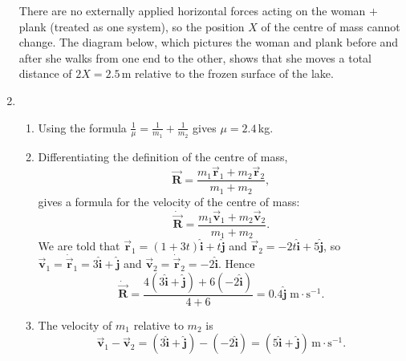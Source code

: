 \documentclass[12pt]{article}
\begin{document}
\begin{enumerate}
  There are no externally applied horizontal forces acting on the woman
  $+$ plank (treated as one system), so the position $X$ of the centre
  of mass cannot change. The diagram below, which pictures the woman and
  plank before and after she walks from one end to the other, shows that
  she moves a total distance of $2X = 2.5\,$m relative to the frozen
  surface of the lake.

\item
  \begin{enumerate}

  \item Using the formula
    $\displaystyle \frac{1}{\mu} = \frac{1}{m_1} + \frac{1}{m_2}$ gives
    $\mu = 2.4\,$kg.

  \item Differentiating the definition of the centre of mass,
    \begin{displaymath}
      \vec{\boldsymbol{R}} = \frac{m_1 \vec{\boldsymbol{r}}_1 + m_2 \vec{\boldsymbol{r}}_2}{m_1 + m_2} ,
    \end{displaymath}
    gives a formula for the velocity of the centre of mass:
    \begin{displaymath}
      \dot{\vec{\boldsymbol{R}}} = \frac{m_1 \vec{\boldsymbol{v}}_1 + m_2 \vec{\boldsymbol{v}}_2}{m_1 + m_2}.
    \end{displaymath}
    We are told that $\vec{\boldsymbol{r}}_1 = (1 + 3t)\boldsymbol{\hat{i}} + t\boldsymbol{\hat{j}}$ and
    $\vec{\boldsymbol{r}}_2 = -2t\boldsymbol{\hat{i}} + 5\boldsymbol{\hat{j}}$, so $\vec{\boldsymbol{v}}_1 = \dot{\vec{\boldsymbol{r}}}_1 = 3\boldsymbol{\hat{i}} + \boldsymbol{\hat{j}}$ and
    $\vec{\boldsymbol{v}}_2 = \dot{\vec{\boldsymbol{r}}}_2 = -2\boldsymbol{\hat{i}}$. Hence
    \begin{displaymath}
      \dot{\vec{\boldsymbol{R}}} = \frac{4(3\boldsymbol{\hat{i}} + \boldsymbol{\hat{j}}) + 6(-2\boldsymbol{\hat{i}})}{4 + 6} = 0.4\boldsymbol{\hat{j}}
      \;\text{m}\cdot\text{s}^{-1}.
    \end{displaymath}

  \item The velocity of $m_1$ relative to $m_2$ is
    \begin{displaymath}
      \vec{\boldsymbol{v}}_1 - \vec{\boldsymbol{v}}_2 = (3\boldsymbol{\hat{i}} + \boldsymbol{\hat{j}}) - (-2\boldsymbol{\hat{i}}) = (5\boldsymbol{\hat{i}} + \boldsymbol{\hat{j}})\,\text{m}\cdot\text{s}^{-1}.
    \end{displaymath}


\end{enumerate}
\end{enumerate}
\end{document}
